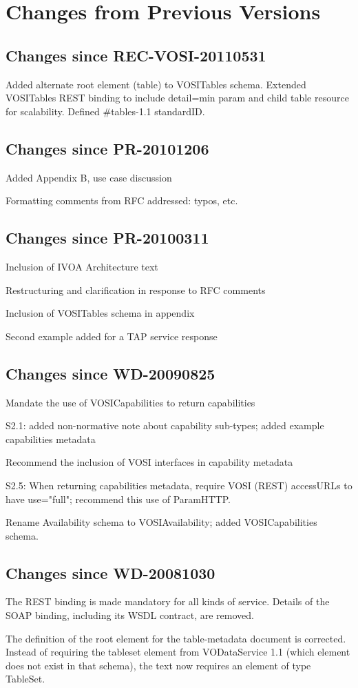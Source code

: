 \documentclass[11pt,letter]{ivoa}
\begin{document}
\section{Changes from Previous Versions}

\subsection{Changes since REC-VOSI-20110531}

Added alternate root element (table) to VOSITables schema. Extended VOSITables REST binding to include detail=min param and child table resource for scalability. Defined \#tables-1.1 standardID.

\subsection{Changes since PR-20101206}

Added Appendix B, use case discussion
    
Formatting comments from RFC addressed: typos, etc.

\subsection{Changes since PR-20100311}

Inclusion of IVOA Architecture text

Restructuring and clarification in response to RFC comments

Inclusion of VOSITables schema in appendix

Second example added for a TAP service response

\subsection{Changes since WD-20090825}

Mandate the use of VOSICapabilities to return capabilities

S2.1: added non-normative note about capability sub-types; added example capabilities metadata

Recommend the inclusion of VOSI interfaces in capability metadata

S2.5: When returning capabilities metadata, require VOSI (REST) accessURLs to have use="full"; recommend this use of ParamHTTP.

Rename Availability schema to VOSIAvailability; added VOSICapabilities schema.

\subsection{Changes since WD-20081030}

The REST binding is made mandatory for all kinds of service. Details of the SOAP binding, including its WSDL contract, are removed.

The definition of the root element for the table-metadata document is corrected. Instead of requiring the tableset element from VODataService 1.1 (which element does not exist in that schema), the text now requires an element of type TableSet. 



\end{document}
